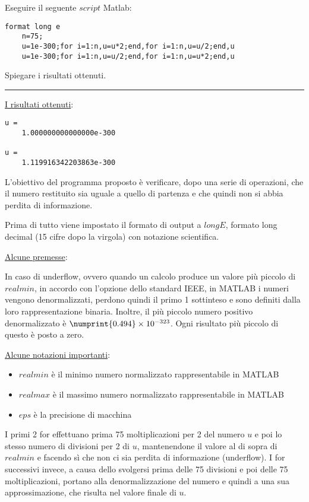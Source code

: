 Eseguire il seguente $script$ Matlab:
\begin{lstlisting}[caption = {}]
	format long e
	n=75;
	u=1e-300;for i=1:n,u=u*2;end,for i=1:n,u=u/2;end,u
	u=1e-300;for i=1:n,u=u/2;end,for i=1:n,u=u*2;end,u
\end{lstlisting}
Spiegare i risultati ottenuti.

\hspace*{\fill}
\par\noindent\rule{\textwidth}{0.4pt}
\hspace*{\fill}

\underline{I risultati ottenuti}:
\begin{lstlisting}[caption = {}]
u = 
	1.000000000000000e-300

u = 
	1.119916342203863e-300
\end{lstlisting}

L'obiettivo del programma proposto è verificare, dopo una serie di operazioni, che il numero restituito sia uguale a quello di partenza e
che quindi non si abbia perdita di informazione.

Prima di tutto viene impostato il formato di output a $longE$, formato long decimal (15 cifre dopo la virgola) con notazione scientifica.

\underline{Alcune premesse}:

In caso di underflow, ovvero quando un calcolo produce un valore più piccolo di $realmin$, in accordo con l’opzione dello standard IEEE, 
in MATLAB i numeri vengono denormalizzati, perdono quindi il primo 1 sottinteso e sono definiti dalla loro rappresentazione binaria.
Inoltre, il più piccolo numero positivo denormalizzato è $\numprint{0.494}\times10^{-323}$. Ogni risultato più piccolo di questo è posto a zero.

\underline{Alcune notazioni importanti}:
\begin{itemize}
	\item $realmin$ è il minimo numero normalizzato rappresentabile in MATLAB
	\item $realmax$ è il massimo numero normalizzato rappresentabile in MATLAB
	\item $eps$ è la precisione di macchina
\end{itemize}

I primi 2 for effettuano prima 75 moltiplicazioni per 2 del numero $u$ e poi lo stesso numero di divisioni per 2 di $u$, 
mantenendone il valore al di sopra di $realmin$ e facendo sì che non ci sia perdita di informazione (underflow).
I for successivi invece, a causa dello svolgersi prima delle 75 divisioni e poi delle 75 moltiplicazioni, portano alla denormalizzazione del numero e
quindi a una sua approssimazione, che risulta nel valore finale di $u$.
